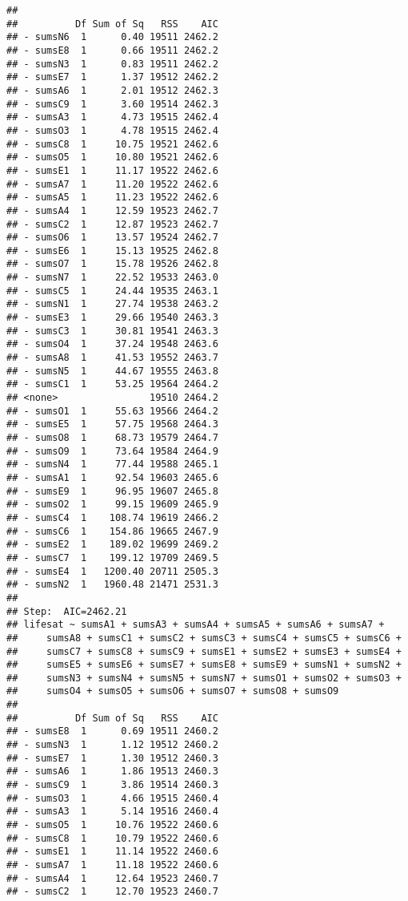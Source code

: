 \documentclass[,man,floatsintext]{apa6}
\begin{document}
\begin{verbatim}
## 
##          Df Sum of Sq   RSS    AIC
## - sumsN6  1      0.40 19511 2462.2
## - sumsE8  1      0.66 19511 2462.2
## - sumsN3  1      0.83 19511 2462.2
## - sumsE7  1      1.37 19512 2462.2
## - sumsA6  1      2.01 19512 2462.3
## - sumsC9  1      3.60 19514 2462.3
## - sumsA3  1      4.73 19515 2462.4
## - sumsO3  1      4.78 19515 2462.4
## - sumsC8  1     10.75 19521 2462.6
## - sumsO5  1     10.80 19521 2462.6
## - sumsE1  1     11.17 19522 2462.6
## - sumsA7  1     11.20 19522 2462.6
## - sumsA5  1     11.23 19522 2462.6
## - sumsA4  1     12.59 19523 2462.7
## - sumsC2  1     12.87 19523 2462.7
## - sumsO6  1     13.57 19524 2462.7
## - sumsE6  1     15.13 19525 2462.8
## - sumsO7  1     15.78 19526 2462.8
## - sumsN7  1     22.52 19533 2463.0
## - sumsC5  1     24.44 19535 2463.1
## - sumsN1  1     27.74 19538 2463.2
## - sumsE3  1     29.66 19540 2463.3
## - sumsC3  1     30.81 19541 2463.3
## - sumsO4  1     37.24 19548 2463.6
## - sumsA8  1     41.53 19552 2463.7
## - sumsN5  1     44.67 19555 2463.8
## - sumsC1  1     53.25 19564 2464.2
## <none>                19510 2464.2
## - sumsO1  1     55.63 19566 2464.2
## - sumsE5  1     57.75 19568 2464.3
## - sumsO8  1     68.73 19579 2464.7
## - sumsO9  1     73.64 19584 2464.9
## - sumsN4  1     77.44 19588 2465.1
## - sumsA1  1     92.54 19603 2465.6
## - sumsE9  1     96.95 19607 2465.8
## - sumsO2  1     99.15 19609 2465.9
## - sumsC4  1    108.74 19619 2466.2
## - sumsC6  1    154.86 19665 2467.9
## - sumsE2  1    189.02 19699 2469.2
## - sumsC7  1    199.12 19709 2469.5
## - sumsE4  1   1200.40 20711 2505.3
## - sumsN2  1   1960.48 21471 2531.3
## 
## Step:  AIC=2462.21
## lifesat ~ sumsA1 + sumsA3 + sumsA4 + sumsA5 + sumsA6 + sumsA7 + 
##     sumsA8 + sumsC1 + sumsC2 + sumsC3 + sumsC4 + sumsC5 + sumsC6 + 
##     sumsC7 + sumsC8 + sumsC9 + sumsE1 + sumsE2 + sumsE3 + sumsE4 + 
##     sumsE5 + sumsE6 + sumsE7 + sumsE8 + sumsE9 + sumsN1 + sumsN2 + 
##     sumsN3 + sumsN4 + sumsN5 + sumsN7 + sumsO1 + sumsO2 + sumsO3 + 
##     sumsO4 + sumsO5 + sumsO6 + sumsO7 + sumsO8 + sumsO9
## 
##          Df Sum of Sq   RSS    AIC
## - sumsE8  1      0.69 19511 2460.2
## - sumsN3  1      1.12 19512 2460.2
## - sumsE7  1      1.30 19512 2460.3
## - sumsA6  1      1.86 19513 2460.3
## - sumsC9  1      3.86 19514 2460.3
## - sumsO3  1      4.66 19515 2460.4
## - sumsA3  1      5.14 19516 2460.4
## - sumsO5  1     10.76 19522 2460.6
## - sumsC8  1     10.79 19522 2460.6
## - sumsE1  1     11.14 19522 2460.6
## - sumsA7  1     11.18 19522 2460.6
## - sumsA4  1     12.64 19523 2460.7
## - sumsC2  1     12.70 19523 2460.7

\end{verbatim}
\end{document}
